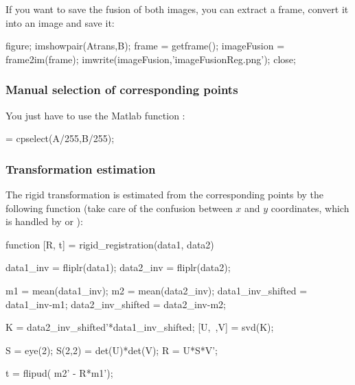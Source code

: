 If you want to save the fusion of both images, you can extract a frame, convert it into an image and save it:
\begin{matlab}
figure; imshowpair(Atrans,B);
frame = getframe();
imageFusion = frame2im(frame);
imwrite(imageFusion,'imageFusionReg.png');
close;
\end{matlab}


\subsubsection{Manual selection of corresponding points}
You just have to use the Matlab function :
\begin{matlab}
 = cpselect(A/255,B/255);
\end{matlab}

\subsubsection{Transformation estimation}
The rigid transformation is estimated from the corresponding points by the following function (take care of the confusion between $x$ and $y$ coordinates, which is handled by  or ):
\begin{matlab}
function [R, t] = rigid_registration(data1, data2)

data1_inv = fliplr(data1);
data2_inv = fliplr(data2);

m1 = mean(data1_inv);
m2 = mean(data2_inv);
data1_inv_shifted = data1_inv-m1;
data2_inv_shifted = data2_inv-m2;

K = data2_inv_shifted'*data1_inv_shifted;
[U,~,V] = svd(K);

S = eye(2);
S(2,2) = det(U)*det(V);
R = U*S*V';

t = flipud( m2' - R*m1');
\end{matlab}

